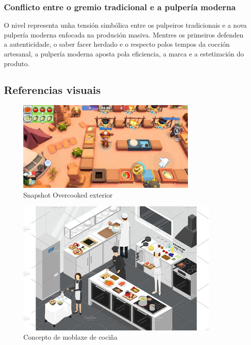 \documentclass{report}  %
\begin{document}
\subsubsection{Conflicto entre o gremio tradicional e a pulpería moderna}
O nivel representa unha tensión simbólica entre os pulpeiros tradicionais e a nova pulpería moderna enfocada na produción masiva. Mentres os primeiros defenden a autenticidade, o saber facer herdado e o respecto polos tempos da cocción artesanal, a pulpería moderna aposta pola eficiencia, a marca e a estetización do produto.

\newpage
\subsection{Referencias visuais}
\begin{figure}[h]
    \centering
    \includegraphics[width=0.8\textwidth]{images/overcooked_concept.jpg}
    \caption{Snapshot Overcooked exterior}
    \label{fig:Snapshot Overcooked exterior}
\end{figure}

\begin{figure}[h]
    \centering
    \includegraphics[width=0.9\textwidth]{images/kitchen_furniture_concept.jpg}
    \caption{Concepto de moblaxe de cociña}
    \label{fig:Snapshot Overcooked}
\end{figure}
\end{document}
